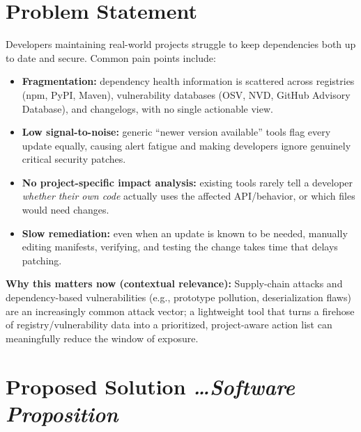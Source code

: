 \documentclass[11pt,a4paper]{article}
\newcommand{\BvrHint}[1]{%
  {\normalfont\normalsize\itshape\hfill #1}}
\begin{document}
\section{Problem Statement}
Developers maintaining real-world projects struggle to keep dependencies both up to date and secure. Common pain points include:
\begin{itemize}[leftmargin=0.7cm]
    \item \textbf{Fragmentation:} dependency health information is scattered across registries (npm, PyPI, Maven), vulnerability databases (OSV, NVD, GitHub Advisory Database), and changelogs, with no single actionable view.
    \item \textbf{Low signal-to-noise:} generic ``newer version available'' tools flag every update equally, causing alert fatigue and making developers ignore genuinely critical security patches.
    \item \textbf{No project-specific impact analysis:} existing tools rarely tell a developer \emph{whether their own code} actually uses the affected API/behavior, or which files would need changes.
    \item \textbf{Slow remediation:} even when an update is known to be needed, manually editing manifests, verifying, and testing the change takes time that delays patching.
\end{itemize}

\textbf{Why this matters now (contextual relevance):} Supply-chain attacks and dependency-based vulnerabilities (e.g., prototype pollution, deserialization flaws) are an increasingly common attack vector; a lightweight tool that turns a firehose of registry/vulnerability data into a prioritized, project-aware action list can meaningfully reduce the window of exposure.

\section{Proposed Solution %
\BvrHint{\ldots Software Proposition}}
\end{document}

